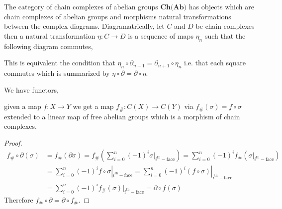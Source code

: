 \documentclass[12pt]{extarticle}
\begin{document}
\begin{definition}
The category of chain complexes of abelian groups $\textbf{Ch(Ab)}$ has objects which are chain complexes of abelian groups and morphisms natural transformations between the complex diagrams. Diagramatrically, let $C$ and $D$ be chain complexes then a natural transformation $\eta : C \to D$ is a sequence of maps $\eta_n$ such that the following diagram commutes,

\begin{center}
\end{center}
This is equivalent the condition that $\eta_{n} \circ \partial_{n + 1} = \partial_{n + 1} \circ \eta_n$ i.e. that each square commutes which is summarized by $\eta \circ \partial = \partial \circ \eta$. 
 
\end{definition}

\begin{proposition}
We have functors,
\begin{center}
\end{center}
given a map $f : X \to Y$ we get a map $f_\# : C(X) \to C(Y)$ via $f_\#(\sigma) = f \circ \sigma $ extended to a linear map of free abelian groups which is a morphism of chain complexes.
\end{proposition}

\begin{proof}
\begin{align*}
f_\# \circ \partial(\sigma) & = f_\#(\partial \sigma) = f_\# \left( \sum_{i = 0}^n (-1)^i \sigma|_{i^{\mathrm{th}}-\text{face}} \right) =  \sum_{i = 0}^n (-1)^i f_\#(\sigma|_{i^{\mathrm{th}}-\text{face}}) 
\\
& = \sum_{i = 0}^n (-1)^i f \circ \sigma|_{i^{\mathrm{th}}-\text{face}} = \sum_{i = 0}^n (-1)^i (f \circ \sigma)|_{i^{\mathrm{th}}-\text{face}} 
\\
& = \sum_{i = 0}^n (-1)^i f_\#(\sigma)|_{i^{\mathrm{th}}-\text{face}} = \partial \circ f (\sigma) 
\end{align*}
Therefore $f_\# \circ \partial = \partial \circ f_\#$. 
\end{proof}
\end{document}
